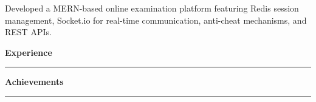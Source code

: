 \documentclass[10pt,a4paper]{article}
\begin{document}
Developed a MERN-based online examination platform featuring Redis session management, Socket.io for real-time communication, anti-cheat mechanisms, and REST APIs.\\

\vspace{0.2cm}

\noindent\textbf{Experience}\par
\rule{\linewidth}{0.5pt}\par

\vspace{0.2cm}

\noindent\textbf{Achievements}\par
\rule{\linewidth}{0.5pt}\par
\end{document}
